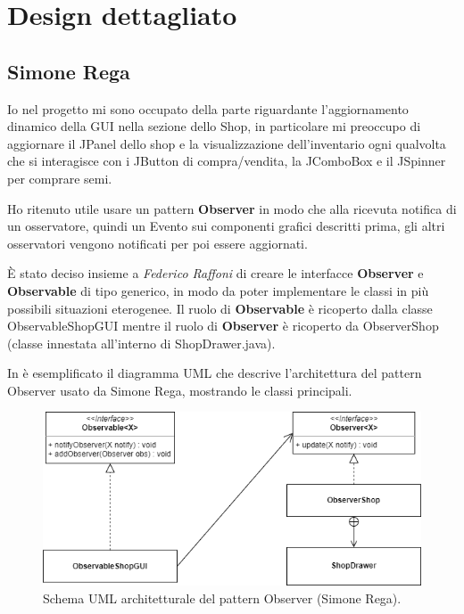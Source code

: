 \documentclass[a4paper,12pt]{report}
\begin{document}
\section{Design dettagliato}

\subsection{Simone Rega}
Io nel progetto mi sono occupato della parte riguardante l’aggiornamento dinamico della GUI nella sezione dello Shop, in particolare mi preoccupo di aggiornare il JPanel dello shop e la visualizzazione dell’inventario ogni qualvolta che si interagisce con i JButton di compra/vendita, la JComboBox e il JSpinner per comprare semi. 

Ho ritenuto utile usare un pattern \textbf{Observer} in modo che alla ricevuta notifica di un osservatore, quindi un Evento sui componenti grafici descritti prima, gli altri osservatori vengono notificati per poi essere aggiornati.

\hfill\break
È stato deciso insieme a\textit{ Federico Raffoni} di creare le interfacce \textbf{Observer} e \textbf{Observable} di tipo generico, in modo da poter implementare le classi in più possibili situazioni eterogenee.
Il ruolo di \textbf{Observable} è ricoperto dalla classe ObservableShopGUI mentre il ruolo di \textbf{Observer} è ricoperto da ObserverShop (classe innestata all’interno di ShopDrawer.java). 

\hfill\break
In  è esemplificato il diagramma UML che descrive l'architettura del pattern Observer usato da Simone Rega, mostrando le classi principali.
\hfill\break

\begin{figure}[!htb]
	\centerline{\includegraphics[scale=0.8]{img/UML_ObserverSimo.png}}
	
	\caption{Schema UML architetturale del pattern Observer (Simone Rega).}
	\label{img:SimoneRega_Observer}
\end{figure}
\end{document}
